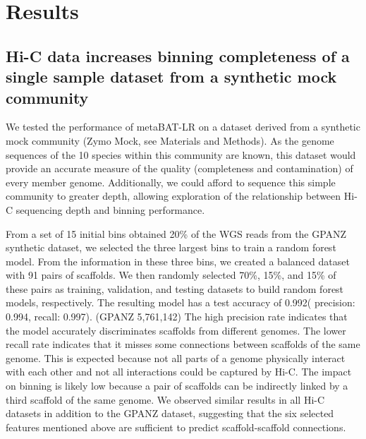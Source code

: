 \documentclass[fleqn,10pt,lineno]{wlpeerj}
\begin{document}
\section*{Results}

\subsection*{Hi-C data increases binning completeness of a single sample dataset from a synthetic mock community}

We tested the performance of metaBAT-LR on a dataset derived from a synthetic mock community (Zymo Mock, see Materials and Methods). As the genome sequences of the 10 species within this community are known, this dataset would provide an accurate measure of the quality (completeness and contamination) of every member genome. Additionally, we could afford to sequence this simple community to greater depth, allowing exploration of the relationship between Hi-C sequencing depth and binning performance.

From a set of 15 initial bins obtained 20\% of the WGS reads from the GPANZ synthetic dataset, we selected the three largest bins to train a random forest model. From the information in these three bins, we created a balanced dataset with 91 pairs of scaffolds. We then randomly selected 70\%, 15\%, and 15\% of these pairs as training, validation, and testing datasets to build random forest models, respectively. The resulting model has a test accuracy of 0.992( precision: 0.994, recall: 0.997). (GPANZ 5,761,142) The high precision rate indicates that the model accurately discriminates scaffolds from different genomes. The lower recall rate indicates that it misses some connections between scaffolds of the same genome. This is expected because not all parts of a genome physically interact with each other and not all interactions could be captured by Hi-C. The impact on binning is likely low because a pair of scaffolds can be indirectly linked by a third scaffold of the same genome.  We observed similar results in all Hi-C datasets in addition to the GPANZ dataset, suggesting that the six selected features mentioned above are sufficient to predict scaffold-scaffold connections. 
\end{document}
